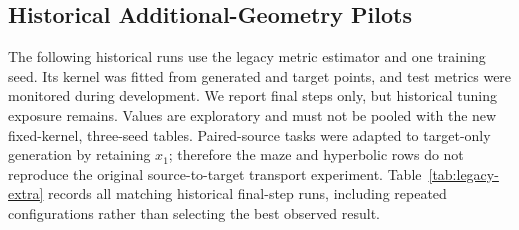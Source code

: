 \subsection{Historical Additional-Geometry Pilots}
The following historical runs use the legacy metric estimator and one training seed. Its kernel was fitted from generated and target points, and test metrics were monitored during development. We report final steps only, but historical tuning exposure remains. Values are exploratory and must not be pooled with the new fixed-kernel, three-seed tables. Paired-source tasks were adapted to target-only generation by retaining $x_1$; therefore the maze and hyperbolic rows do not reproduce the original source-to-target transport experiment.
Table~\ref{tab:legacy-extra} records all matching historical final-step runs, including repeated configurations rather than selecting the best observed result.
